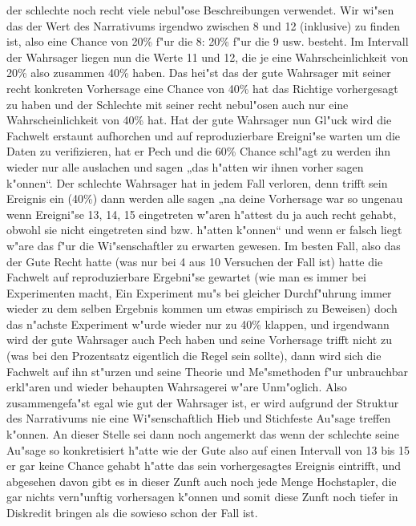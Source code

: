 \documentclass[a5paper,8pt]{book}
\begin{document}
der schlechte noch recht viele nebul"ose Beschreibungen verwendet. Wir wi"sen das der Wert des Narrativums irgendwo zwischen 8 und 12 (inklusive) zu finden ist, also eine Chance von 20\% f"ur die 8: 20\% f"ur die 9 usw. besteht. Im Intervall der Wahrsager liegen nun die Werte 11 und 12, die je eine Wahrscheinlichkeit von 20\% also zusammen 40\% haben. Das hei"st das der gute Wahrsager mit seiner recht konkreten Vorhersage eine Chance von 40\% hat das Richtige vorhergesagt zu haben und der Schlechte mit seiner recht nebul"osen auch nur eine Wahrscheinlichkeit von 40\% hat. Hat der gute Wahrsager nun Gl"uck wird die Fachwelt erstaunt aufhorchen und auf reproduzierbare Ereigni"se warten um die Daten zu verifizieren, hat er Pech und die 60\% Chance schl"agt zu werden ihn wieder nur alle auslachen und sagen „das h"atten wir ihnen vorher sagen k"onnen“. Der schlechte Wahrsager hat in jedem Fall verloren, denn trifft sein Ereignis ein (40\%) dann werden alle sagen „na deine Vorhersage war so ungenau wenn Ereigni"se 
13, 14, 15 eingetreten w"aren h"attest du ja auch recht gehabt, obwohl sie nicht eingetreten sind bzw. h"atten k"onnen“ und wenn er falsch liegt w"are das f"ur die Wi"senschaftler zu erwarten gewesen. Im besten Fall, also das der Gute Recht hatte (was nur bei 4 aus 10 Versuchen der Fall ist) hatte die Fachwelt auf reproduzierbare Ergebni"se gewartet (wie man es immer bei Experimenten macht, Ein Experiment mu"s bei gleicher Durchf"uhrung immer wieder zu dem selben Ergebnis kommen um etwas empirisch zu Beweisen) doch das n"achste Experiment w"urde wieder nur zu 40\% klappen, und irgendwann wird der gute Wahrsager auch Pech haben und seine Vorhersage trifft nicht zu (was bei den Prozentsatz eigentlich die Regel sein sollte), dann wird sich die Fachwelt auf ihn st"urzen und seine Theorie und Me"smethoden f"ur unbrauchbar erkl"aren und wieder behaupten Wahrsagerei w"are Unm"oglich. 
Also zusammengefa"st egal wie gut der Wahrsager ist, er wird aufgrund der Struktur des Narrativums nie eine Wi"senschaftlich Hieb und Stichfeste Au"sage treffen k"onnen. An dieser Stelle sei dann noch angemerkt das wenn der schlechte seine Au"sage so konkretisiert h"atte wie der Gute also auf einen Intervall von 13 bis 15 er gar keine Chance gehabt h"atte das sein vorhergesagtes Ereignis eintrifft, und abgesehen davon gibt es in dieser Zunft auch noch jede Menge Hochstapler, die gar nichts vern"unftig vorhersagen k"onnen und somit diese Zunft noch tiefer in Diskredit bringen als die sowieso schon der Fall ist.
\end{document}
